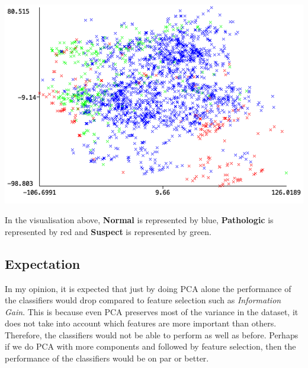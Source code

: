 \documentclass[12pt]{article}
\begin{document}
\begin{center}
    \includegraphics[width=14cm]{images/7_1_principal_components.png}
\end{center}

In the visualisation above, \textbf{Normal} is represented by blue, \textbf{Pathologic} is represented by red and \textbf{Suspect}
is represented by green.

\subsection{Expectation}
In my opinion, it is expected that just by doing PCA alone the performance of the classifiers would drop compared to feature selection
such as \textit{Information Gain}. This is because even PCA preserves most of the variance in the dataset, it does not take into account
which features are more important than others. Therefore, the classifiers would not be able to perform as well as before. Perhaps if we do
PCA with more components and followed by feature selection, then the performance of the classifiers would be on par or better.
\end{document}
